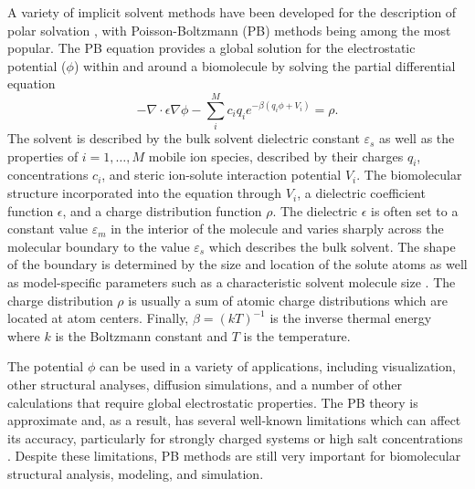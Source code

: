 \documentclass[11pt,titlepage]{article}
\begin{document}
A variety of implicit solvent methods have been developed for the description of polar solvation \cite{Ren2012}, with Poisson-Boltzmann (PB) methods being among the most popular.
The PB equation \cite{Fixman1979, Grochowski2008, Lamm2003} provides a global solution for the electrostatic potential ($\phi$) within and around a biomolecule by solving the partial differential equation
\begin{equation}
	-\nabla \cdot \epsilon \nabla \phi - \sum_i^M c_i q_i e^{-\beta \left(q_i \phi + V_i \right)} = \rho.
\end{equation}
The solvent is described by the bulk solvent dielectric constant $\varepsilon_s$ as well as the properties of $i=1,\ldots,M$ mobile ion species, described by their charges $q_i$, concentrations $c_i$, and steric ion-solute interaction potential $V_i$.
The biomolecular structure incorporated into the equation through $V_i$, a dielectric coefficient function $\epsilon$, and a charge distribution function $\rho$.
The dielectric $\epsilon$ is often set to a constant value $\varepsilon_m$ in the interior of the molecule and varies sharply across the molecular boundary to the value $\varepsilon_s$ which describes the bulk solvent.
The shape of the boundary is determined by the size and location of the solute atoms as well as model-specific parameters such as a characteristic solvent molecule size \cite{LeeRichards}.
The charge distribution $\rho$ is usually a sum of atomic charge distributions which are located at atom centers.
Finally, $\beta = \left( kT \right)^{-1}$ is the inverse thermal energy where $k$ is the Boltzmann constant and $T$ is the temperature.

The potential $\phi$ can be used in a variety of applications, including visualization, other structural analyses, diffusion simulations, and a number of other calculations that require global electrostatic properties.
The PB theory is approximate and, as a result, has several well-known limitations which can affect its accuracy, particularly for strongly charged systems or high salt concentrations \cite{Fixman1979, Netz2000}.
Despite these limitations, PB methods are still very important for biomolecular structural analysis, modeling, and simulation.
\end{document}
